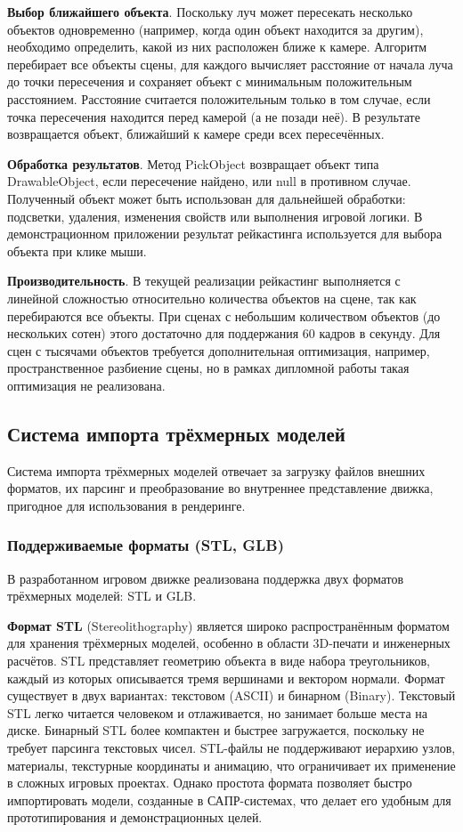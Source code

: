 \textbf{Выбор ближайшего объекта}. Поскольку луч может пересекать несколько объектов одновременно (например, когда один объект находится за другим), необходимо определить, какой из них расположен ближе к камере. Алгоритм перебирает все объекты сцены, для каждого вычисляет расстояние от начала луча до точки пересечения и сохраняет объект с минимальным положительным расстоянием. Расстояние считается положительным только в том случае, если точка пересечения находится перед камерой (а не позади неё). В результате возвращается объект, ближайший к камере среди всех пересечённых.

\textbf{Обработка результатов}. Метод PickObject возвращает объект типа DrawableObject, если пересечение найдено, или null в противном случае. Полученный объект может быть использован для дальнейшей обработки: подсветки, удаления, изменения свойств или выполнения игровой логики. В демонстрационном приложении результат рейкастинга используется для выбора объекта при клике мыши.

\textbf{Производительность}. В текущей реализации рейкастинг выполняется с линейной сложностью относительно количества объектов на сцене, так как перебираются все объекты. При сценах с небольшим количеством объектов (до нескольких сотен) этого достаточно для поддержания 60 кадров в секунду. Для сцен с тысячами объектов требуется дополнительная оптимизация, например, пространственное разбиение сцены, но в рамках дипломной работы такая оптимизация не реализована.

\subsection{Система импорта трёхмерных моделей}
Система импорта трёхмерных моделей отвечает за загрузку файлов внешних форматов, их парсинг и преобразование во внутреннее представление движка, пригодное для использования в рендеринге.

\subsubsection{Поддерживаемые форматы (STL, GLB)}
В разработанном игровом движке реализована поддержка двух форматов трёхмерных моделей: STL и GLB.

\textbf{Формат STL} (Stereolithography) является широко распространённым форматом для хранения трёхмерных моделей, особенно в области 3D-печати и инженерных расчётов. STL представляет геометрию объекта в виде набора треугольников, каждый из которых описывается тремя вершинами и вектором нормали. Формат существует в двух вариантах: текстовом (ASCII) и бинарном (Binary). Текстовый STL легко читается человеком и отлаживается, но занимает больше места на диске. Бинарный STL более компактен и быстрее загружается, поскольку не требует парсинга текстовых чисел. STL-файлы не поддерживают иерархию узлов, материалы, текстурные координаты и анимацию, что ограничивает их применение в сложных игровых проектах. Однако простота формата позволяет быстро импортировать модели, созданные в САПР-системах, что делает его удобным для прототипирования и демонстрационных целей.

